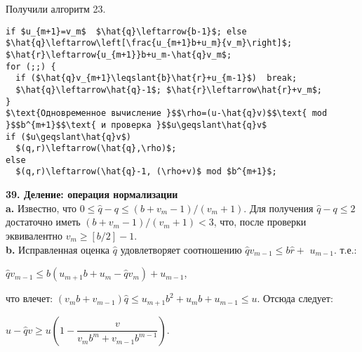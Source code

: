 \documentclass{/home/pkmixer/mai_practice/git_rep/mai_prac_2017/template/mai_book}
\begin{document}
\noindent
Получили алгоритм 23.
\begin{lstlisting}[mathescape=true, caption={Частные и остатки от деления $(u_{m+1}...u_0)$ на $(v_m...v_0)$, где $u/v<b. n\geqslant1$}]
if $u_{m+1}=v_m$  $\hat{q}\leftarrow{b-1}$; else  $\hat{q}\leftarrow\left[\frac{u_{m+1}b+u_m}{v_m}\right]$;
$\hat{r}\leftarrow{u_{m+1}}b+u_m-\hat{q}v_m$;
for (;;) {
  if ($\hat{q}v_{m+1}\leqslant{b}\hat{r}+u_{m-1}$)  break;
  $\hat{q}\leftarrow\hat{q}-1$; $\hat{r}\leftarrow\hat{r}+v_m$;
}
$\text{Одновременное вычисление }$$\rho=(u-\hat{q}v)$$\text{ mod }$$b^{m+1}$$\text{ и проверка }$$u\geqslant\hat{q}v$
if ($u\geqslant\hat{q}v$)
  $(q,r)\leftarrow(\hat{q},\rho)$;
else
  $(q,r)\leftarrow(\hat{q}-1, (\rho+v)$ mod $b^{m+1}$;
\end{lstlisting}
\textbf{39. Деление: операция нормализации}\\
\hspace*{15pt}\textbf{a.} Известно, что $0\leqslant\hat{q}-q\leqslant(b+v_m-1)/(v_m+1)$. Для получения\linebreak
$\hat{q}-q\leqslant2$ достаточно иметь $(b+v_m-1)/(v_m+1)<3$, что, после проверки\linebreak
эквивалентно $v_m\geqslant[b/2]-1$.\\

\textbf{b.} Исправленная оценка $\hat{q}$ удовлетворяет соотношению $\hat{q}v_{m-1}\leqslant{b}\hat{r}+$\linebreak
$u_{m-1}$. т.е.:
\begin{center}
$\hat{q}v_{m-1}\leqslant{b}(u_{m+1}b+u_m-\hat{q}v_m)+u_{m-1}$,
\end{center}
что влечет: $(v_mb+v_{m-1})\hat{q}\leqslant{u_{m+1}}b^2+u_mb+u_{m-1}\leqslant{u}$. Отсюда следует:\linebreak
\begin{center}
$u-\hat{q}v\geqslant{u(1-\dfrac{v}{v_mb^m+v_{m-1}b^{m-1}})}$.
\end{center}
\end{document}
